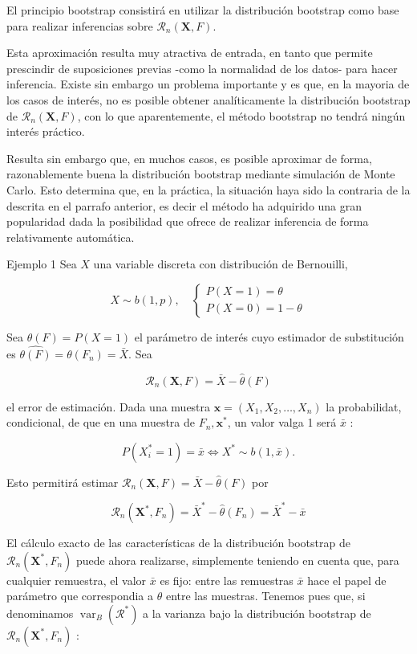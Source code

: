 \documentclass[
]{article}
\begin{document}
El principio bootstrap consistirá en utilizar la distribución bootstrap como base para realizar inferencias sobre \(\mathcal{R}_{n}(\mathbf{X}, F)\).

Esta aproximación resulta muy atractiva de entrada, en tanto que permite prescindir de suposiciones previas -como la normalidad de los datos- para hacer inferencia. Existe sin embargo un problema importante y es que, en la mayoria de los casos de interés, no es posible obtener analíticamente la distribución bootstrap de \(\mathcal{R}_{n}(\mathbf{X}, F)\), con lo que aparentemente, el método bootstrap no tendrá ningún interés práctico.

Resulta sin embargo que, en muchos casos, es posible aproximar de forma, razonablemente buena la distribución bootstrap mediante simulación de Monte Carlo. Esto determina que, en la práctica, la situación haya sido la contraria de la descrita en el parrafo anterior, es decir el método ha adquirido una gran popularidad dada la posibilidad que ofrece de realizar inferencia de forma relativamente automática.

Ejemplo 1 Sea \(X\) una variable discreta con distribución de Bernouilli,

\[
X \sim b(1, p), \quad\left\{\begin{array}{l}
P(X=1)=\theta \\
P(X=0)=1-\theta
\end{array}\right.
\]

Sea \(\theta(F)=P(X=1)\) el parámetro de interés cuyo estimador de substitución es \(\widehat{\theta(F)}=\theta\left(F_{n}\right)=\bar{X}\). Sea

\[
\mathcal{R}_{n}(\mathbf{X}, F)=\bar{X}-\hat{\theta}(F)
\]

el error de estimación. Dada una muestra \(\mathbf{x}=\left(X_{1}, X_{2}, \ldots, X_{n}\right)\) la probabilidat, condicional, de que en una muestra de \(F_{n}, \mathbf{x}^{*}\), un valor valga 1 será \(\bar{x}\) :

\[
P\left(X_{i}^{*}=1\right)=\bar{x} \Leftrightarrow X^{*} \sim b(1, \bar{x}) .
\]

Esto permitirá estimar \(\mathcal{R}_{n}(\mathbf{X}, F)=\bar{X}-\hat{\theta}(F)\) por

\[
\mathcal{R}_{n}\left(\mathbf{X}^{*}, F_{n}\right)=\bar{X}^{*}-\hat{\theta}\left(F_{n}\right)=\bar{X}^{*}-\bar{x}
\]

El cálculo exacto de las características de la distribución bootstrap de \(\mathcal{R}_{n}\left(\mathbf{X}^{*}, F_{n}\right)\) puede ahora realizarse, simplemente teniendo en cuenta que, para cualquier remuestra, el valor \(\bar{x}\) es fijo: entre las remuestras \(\bar{x}\) hace el papel de parámetro que correspondia a \(\theta\) entre las muestras. Tenemos pues que, si denominamos \(\operatorname{var}_{B}\left(\mathcal{R}^{*}\right)\) a la varianza bajo la distribución bootstrap de \(\mathcal{R}_{n}\left(\mathbf{X}^{*}, F_{n}\right)\) :
\end{document}
